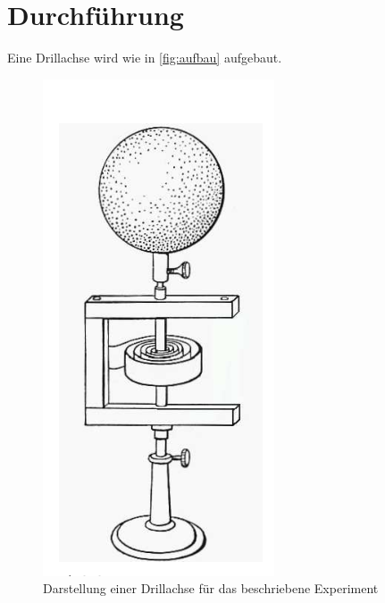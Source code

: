 \section{Durchführung}
\label{sec:Durchführung}

Eine Drillachse wird wie in \autoref{fig:aufbau} aufgebaut.

\begin{figure}
    \centering
    \includegraphics[width=\textwidth/2]{images/aufbau.png}
    \caption{Darstellung einer Drillachse für das beschriebene Experiment \cite{V101}}
    \label{fig:aufbau}
\end{figure}

